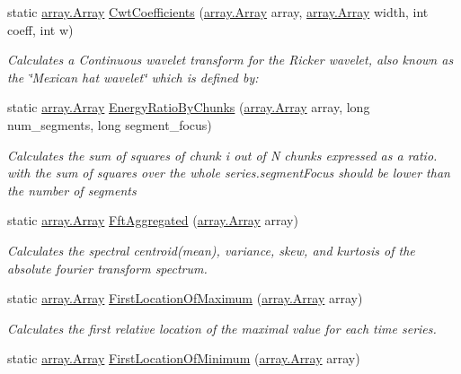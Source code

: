 \begin{DoxyCompactItemize}
static \mbox{\hyperlink{classkhiva_1_1array_1_1_array}{array.\+Array}} \mbox{\hyperlink{classkhiva_1_1features_1_1_features_afa6e9b78f842ac8f61a81047527e3f74}{Cwt\+Coefficients}} (\mbox{\hyperlink{classkhiva_1_1array_1_1_array}{array.\+Array}} array, \mbox{\hyperlink{classkhiva_1_1array_1_1_array}{array.\+Array}} width, int coeff, int w)
\begin{DoxyCompactList}\small\item\em Calculates a Continuous wavelet transform for the Ricker wavelet, also known as the \char`\"{}\+Mexican hat wavelet\char`\"{} which is defined by\+: \end{DoxyCompactList}\item 
static \mbox{\hyperlink{classkhiva_1_1array_1_1_array}{array.\+Array}} \mbox{\hyperlink{classkhiva_1_1features_1_1_features_a3e87d889e02f21b8c5568bd6faaaaeb3}{Energy\+Ratio\+By\+Chunks}} (\mbox{\hyperlink{classkhiva_1_1array_1_1_array}{array.\+Array}} array, long num\+\_\+segments, long segment\+\_\+focus)
\begin{DoxyCompactList}\small\item\em Calculates the sum of squares of chunk i out of N chunks expressed as a ratio. with the sum of squares over the whole series.\+segment\+Focus should be lower than the number of segments \end{DoxyCompactList}\item 
static \mbox{\hyperlink{classkhiva_1_1array_1_1_array}{array.\+Array}} \mbox{\hyperlink{classkhiva_1_1features_1_1_features_a669ffd81229f9fd3bc8dd33434585606}{Fft\+Aggregated}} (\mbox{\hyperlink{classkhiva_1_1array_1_1_array}{array.\+Array}} array)
\begin{DoxyCompactList}\small\item\em Calculates the spectral centroid(mean), variance, skew, and kurtosis of the absolute fourier transform spectrum. \end{DoxyCompactList}\item 
static \mbox{\hyperlink{classkhiva_1_1array_1_1_array}{array.\+Array}} \mbox{\hyperlink{classkhiva_1_1features_1_1_features_a336ef7bbade66652a361d94acf475fc1}{First\+Location\+Of\+Maximum}} (\mbox{\hyperlink{classkhiva_1_1array_1_1_array}{array.\+Array}} array)
\begin{DoxyCompactList}\small\item\em Calculates the first relative location of the maximal value for each time series. \end{DoxyCompactList}\item 
static \mbox{\hyperlink{classkhiva_1_1array_1_1_array}{array.\+Array}} \mbox{\hyperlink{classkhiva_1_1features_1_1_features_ac9bd93efc7e586df11c5208985794832}{First\+Location\+Of\+Minimum}} (\mbox{\hyperlink{classkhiva_1_1array_1_1_array}{array.\+Array}} array)

\end{DoxyCompactItemize}

